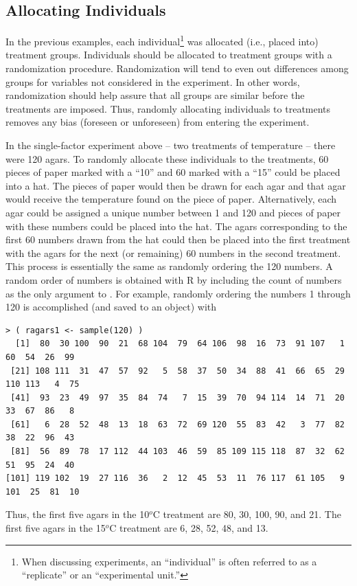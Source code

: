 \documentclass[10pt,openany]{book}\usepackage[]{graphicx}\usepackage[]{color}
\makeatletter
\newenvironment{kframe}{%
 \def\at@end@of@kframe{}%
 \ifinner\ifhmode%
  \def\at@end@of@kframe{\end{minipage}}%
  \begin{minipage}{\columnwidth}%
 \fi\fi%
 \def\FrameCommand##1{\hskip\@totalleftmargin \hskip-\fboxsep
 \colorbox{shadecolor}{##1}\hskip-\fboxsep
     \hskip-\linewidth \hskip-\@totalleftmargin \hskip\columnwidth}%
 \MakeFramed {\advance\hsize-\width
   \@totalleftmargin\z@ \linewidth\hsize
   \@setminipage}}%
 {\par\unskip\endMakeFramed%
 \at@end@of@kframe}
\newenvironment{knitrout}{}{} %
\makeatother
\begin{document}


\subsection{Allocating Individuals}
In the previous examples, each individual\footnote{When discussing experiments, an ``individual'' is often referred to as a ``replicate'' or an ``experimental unit.''} was allocated (i.e., placed into) treatment groups.  Individuals should be allocated to treatment groups with a randomization procedure.  Randomization will tend to even out differences among groups for variables not considered in the experiment.  In other words, randomization should help assure that all groups are similar before the treatments are imposed.  Thus, randomly allocating individuals to treatments removes any bias (foreseen or unforeseen) from entering the experiment.

In the single-factor experiment above -- two treatments of temperature -- there were 120 agars.  To randomly allocate these individuals to the treatments, 60 pieces of paper marked with a ``10'' and 60 marked with a ``15'' could be placed into a hat.  The pieces of paper would then be drawn for each agar and that agar would receive the temperature found on the piece of paper.  Alternatively, each agar could be assigned a unique number between 1 and 120 and pieces of paper with these numbers could be placed into the hat.  The agars corresponding to the first 60 numbers drawn from the hat could then be placed into the first treatment with the agars for the next (or remaining) 60 numbers in the second treatment.  This process is essentially the same as randomly ordering the 120 numbers.  A random order of numbers is obtained with R by including the count of numbers as the only argument to .  For example, randomly ordering the numbers 1 through 120 is accomplished (and saved to an object) with
\begin{knitrout}
\color{fgcolor}\begin{kframe}
\begin{verbatim}
> ( ragars1 <- sample(120) )
  [1]  80  30 100  90  21  68 104  79  64 106  98  16  73  91 107   1  60  54  26  99
 [21] 108 111  31  47  57  92   5  58  37  50  34  88  41  66  65  29 110 113   4  75
 [41]  93  23  49  97  35  84  74   7  15  39  70  94 114  14  71  20  33  67  86   8
 [61]   6  28  52  48  13  18  63  72  69 120  55  83  42   3  77  82  38  22  96  43
 [81]  56  89  78  17 112  44 103  46  59  85 109 115 118  87  32  62  51  95  24  40
[101] 119 102  19  27 116  36   2  12  45  53  11  76 117  61 105   9 101  25  81  10
\end{verbatim}
\end{kframe}
\end{knitrout}
Thus, the first five agars in the 10$^{o}$C treatment are 80, 30, 100, 90, and 21.  The first five agars in the 15$^{o}$C treatment are 6, 28, 52, 48, and 13.
\end{document}
